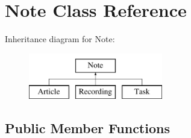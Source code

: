 \hypertarget{class_note}{}\section{Note Class Reference}
\label{class_note}
Inheritance diagram for Note\+:\begin{figure}[H]
\begin{center}
\leavevmode
\includegraphics[height=2.000000cm]{class_note}
\end{center}
\end{figure}
\subsection*{Public Member Functions}

